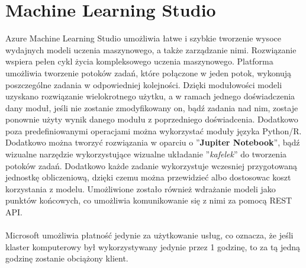 \section{Machine Learning Studio}
Azure Machine Learning Studio umożliwia łatwe i szybkie tworzenie wysoce wydajnych modeli uczenia maszynowego, a także zarządzanie nimi. Rozwiązanie wspiera pełen cykl życia kompleksowego uczenia maszynowego. Platforma umożliwia tworzenie potoków zadań, które połączone w jeden potok, wykonują poszczególne zadania w odpowiedniej kolejności. Dzięki modułowości modeli uzyskano rozwiązanie wielokrotnego użytku, a w ramach jednego doświadczenia dany moduł, jeśli nie zostanie zmodyfikowany on, bądź zadania nad nim, zostaje ponownie użyty wynik danego modułu z poprzedniego doświadcenia. Dodatkowo poza predefiniowanymi operacjami można wykorzystać moduły języka Python/R. Dodatkowo można tworzyć rozwiązania w oparciu o ''\textbf{Jupiter Notebook}'', bądź wizualne narzędzie wykorzystujące wizualne układanie ''\textit{kafelek}'' do tworzenia potoków zadań. Dodatkowo każde zadanie wykorzystuje wczesniej przygotowaną jednostkę obliczeniową, dzięki czemu można przewidzieć albo dostosowac koszt korzystania z modelu. Umożliwione zostało również wdrażanie modeli jako punktów końcowych, co umożliwia komunikowanie się z nimi za pomocą REST API.
\\ \\
Microsoft umożliwia płatność jedynie za użytkowanie usług, co oznacza, że jeśli klaster komputerowy był wykorzystywany jedynie przez 1 godzinę, to za tą jedną godzinę zostanie obciążony klient\cite{MicrosoftAzuref}.